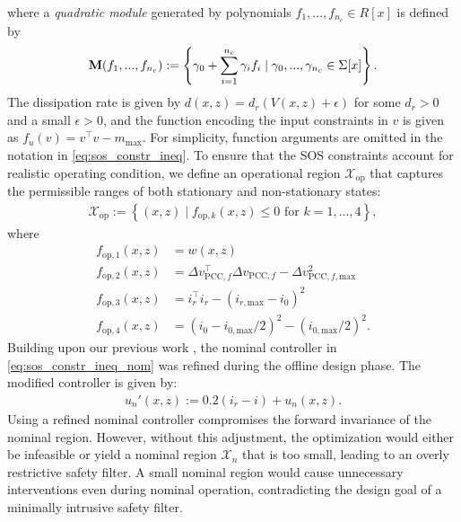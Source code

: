 \documentclass[lettersize,journal]{IEEEtran}
\begin{document}
where a \emph{quadratic module} generated by polynomials $f_1, ..., f_{n_c} \in R[x]$ is defined by
\begin{align}
   \textbf M(f_1, ..., f_{n_c}) := \left \{ \gamma_0 + \sum_{i=1}^{n_c} \gamma_i f_i \mid \gamma_0, ..., \gamma_{n_c} \in \Sigma[x] \right \}.
\end{align}
The dissipation rate is given by $d(x, z) = d_r (V(x, z) + \epsilon)$ for some $d_r > 0$ and a small $\epsilon > 0$, and the function encoding the input constraints in $v$ is given as $f_u(v) = v^\top v - m_\text{max}$.
For simplicity, function arguments are omitted in the notation in \cref{eq:sos_constr_ineq}.
To ensure that the SOS constraints account for realistic operating condition, we define an operational region $\mathcal X_\mathrm{op}$ that captures the permissible ranges of both stationary and non-stationary states:
\begin{align}
   \mathcal X_\text{op} := \left \{ (x, z) \mid f_{\mathrm{op}, k}(x,z) \leq 0 \text{ for } k = 1, ..., 4 \right \},
\end{align}
where
\begin{align*}
   f_{\mathrm{op}, 1}(x,z) &= w(x, z) \\
   f_{\mathrm{op}, 2}(x,z) &= \Delta v_{\text{PCC},f}^\top \Delta v_{\text{PCC},f} - \Delta v_{\text{PCC},f,\text{max}}^2 \\
   f_{\mathrm{op}, 3}(x,z) &= i_r^\top i_r - (i_{r,\text{max}} - i_0)^2 \\
   f_{\mathrm{op}, 4}(x,z) &= (i_0-i_{0,\text{max}}/2)^2 - (i_{0,\text{max}}/2)^2.
\end{align*}
Building upon our previous work \cite{schneeberger2024advancedbess}, the nominal controller in \cref{eq:sos_constr_ineq_nom} was refined during the offline design phase.
The modified controller is given by:
\begin{align*}
   u_{n}'(x, z) := 0.2 (i_r - i) + u_n(x, z).
\end{align*}
Using a refined nominal controller compromises the forward invariance of the nominal region.
However, without this adjustment, the optimization would either be infeasible or yield a nominal region $\mathcal X_n$ that is too small, leading to an overly restrictive safety filter. 
A small nominal region would cause unnecessary interventions even during nominal operation, contradicting the design goal of a minimally intrusive safety filter.
\end{document}
